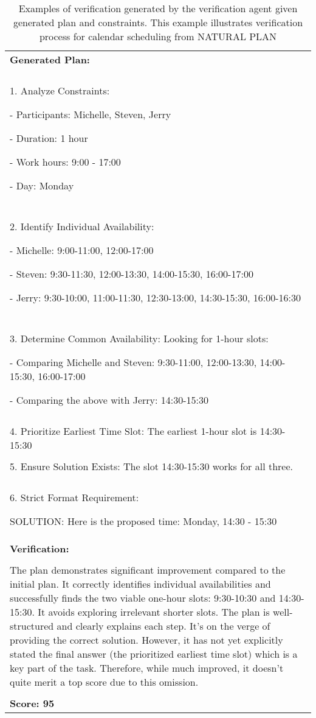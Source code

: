 \begin{table*}
\begin{tabular}{p{\linewidth}}
\textbf{Generated Plan:}
\\\\
1. Analyze Constraints:

- Participants: Michelle, Steven, Jerry

- Duration: 1 hour

- Work hours: 9:00 - 17:00

- Day: Monday
\\\\
2. Identify Individual Availability:

- Michelle: 9:00-11:00, 12:00-17:00

- Steven: 9:30-11:30, 12:00-13:30, 14:00-15:30, 16:00-17:00

- Jerry: 9:30-10:00, 11:00-11:30, 12:30-13:00, 14:30-15:30, 16:00-16:30
\\\\
3. Determine Common Availability: Looking for 1-hour slots:

- Comparing Michelle and Steven: 9:30-11:00, 12:00-13:30, 14:00-15:30, 16:00-17:00

- Comparing the above with Jerry:  14:30-15:30
\\\\
4. Prioritize Earliest Time Slot: The earliest 1-hour slot is 14:30-15:30
\\\\
5. Ensure Solution Exists:  The slot 14:30-15:30 works for all three.
\\\\
6. Strict Format Requirement:

SOLUTION: Here is the proposed time: Monday, 14:30 - 15:30 \\ \midrule

\textbf{Verification:}
\\\\
The plan demonstrates significant improvement compared to the initial plan.  It correctly identifies individual availabilities and successfully finds the two viable one-hour slots: 9:30-10:30 and 14:30-15:30.  It avoids exploring irrelevant shorter slots.  The plan is well-structured and clearly explains each step.  It's on the verge of providing the correct solution.  However, it has not yet explicitly stated the final answer (the prioritized earliest time slot) which is a key part of the task.  Therefore, while much improved, it doesn't quite merit a top score due to this omission.
\\\\
\textbf{Score: 95}

\\ \bottomrule
\end{tabular}
\caption{Examples of verification generated by the verification agent given generated plan and constraints. This example illustrates verification process for calendar scheduling from NATURAL PLAN}
\label{tab:np_cal_verification_example}
\end{table*}